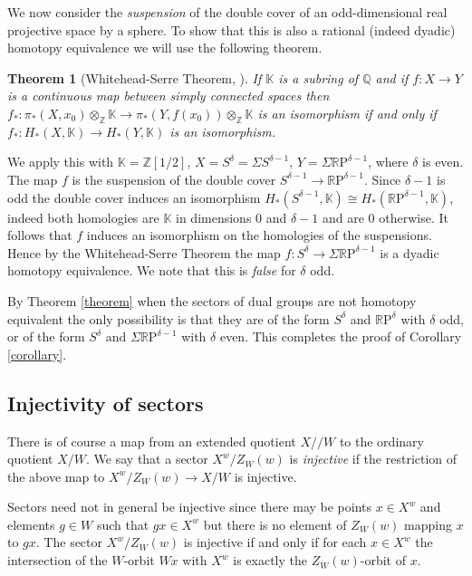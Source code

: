 \documentclass[11pt,a4paper]{article}
\newtheorem{theorem}{Theorem}
\def\R{\mathbb{R}}
\def\Z{\mathbb{Z}}
\def\Q{\mathbb{Q}}
\def\RP{\R\mathrm{P}}
\def\q {{/\!/}}
\begin{document}
We now consider the \emph{suspension} of the double cover of an odd-dimensional real projective space by a sphere. To show that this is also a rational (indeed dyadic) homotopy equivalence we will use the following theorem.

\begin{theorem}[Whitehead-Serre Theorem, {\cite[Theorem 8.6]{felix}}]
    If $\mathbb K$ is a subring of $\Q$ and if $f : X\rightarrow Y$ is a continuous map between simply connected spaces then $f_*:\pi_*(X, x_0) \otimes_\Z \mathbb K\rightarrow \pi_*(Y, f(x_0)) \otimes_\Z \mathbb K$ is an isomorphism if and only if $f_*:H_*(X, \mathbb K)\rightarrow H_*(Y, \mathbb K)$  is an isomorphism. 
\end{theorem}
    


We apply this with $\mathbb K=\Z[1/2]$,  $X= S^\delta=\Sigma S^{\delta-1}$, $Y=\Sigma \RP^{\delta-1}$, where $\delta$ is even. The map $f$ is the suspension of the double cover $S^{\delta-1}\rightarrow \RP^{\delta-1}$. Since $\delta-1$ is odd the double cover induces an isomorphism $H_*(S^{\delta-1},\mathbb K)\cong
H_*(\RP^{\delta-1},\mathbb K)$, indeed both homologies are $\mathbb K$ in dimensions $0$ and $\delta-1$ and are $0$ otherwise. It follows that $f$ induces an isomorphism on  the homologies of the suspensions. Hence by the Whitehead-Serre Theorem the map $f:S^\delta\to\Sigma\RP^{\delta-1}$ is a dyadic homotopy equivalence.  We note  that this is \emph{false} for $\delta$ odd.

\bigskip

By Theorem \ref{theorem} when the sectors of dual groups are not homotopy equivalent the only possibility is that they are of the form $S^\delta$ and $\RP^\delta$ with $\delta$ odd, or of the form $S^\delta$ and $\Sigma\RP^{\delta-1}$ with $\delta$ even. This completes the proof of Corollary \ref{corollary}.


\subsection{Injectivity of sectors}\label{injectivity of sectors}

There is of course a map from an extended quotient $X\q W$ to the ordinary quotient $X/W$. We say that a sector $X^w/Z_W(w)$ is \emph{injective} if the restriction of the above map to $X^w/Z_W(w)\to X/W$ is injective.

Sectors need not in general be injective since there may be points $x\in X^w$ and elements $g\in W$ such that $gx\in X^w$ but there is no element of $Z_W(w)$ mapping $x$ to $gx$. The sector $X^w/Z_W(w)$ is injective if and only if for each $x\in X^w$ the intersection of the $W$-orbit $W\!x$ with $X^w$ is exactly the $Z_W(w)$-orbit of $x$.
\end{document}
